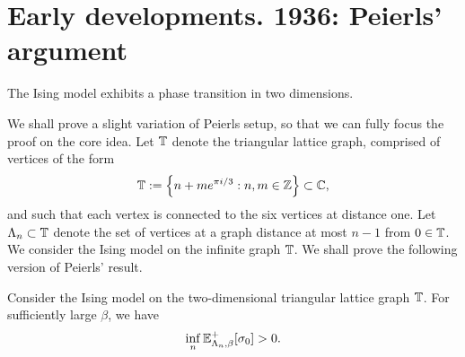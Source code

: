 \section{Early developments. 1936: Peierls' argument}
\label{sec:peierls}

\begin{theorem}[Peierls, 1936]
    \label{thm:peierls}
    The Ising model exhibits a phase transition in two dimensions.
\end{theorem}

We shall prove a slight variation of Peierls setup,
so that we can fully focus the proof on the core idea.
Let $\mathbb T$ denote the triangular lattice graph,
comprised of vertices of the form
\[
    \mathbb T:=\left\{n+m e^{\pi i/3}:n,m\in\mathbb Z \right\}\subset\mathbb C,
\]
and such that each vertex is connected to the six
vertices at distance one.
Let $\Lambda_n\subset\mathbb T$ denote the set of vertices at a graph
distance at most $n-1$ from $0\in\mathbb T$.
We consider the Ising model on the infinite graph $\mathbb T$.
We shall prove the following version of Peierls' result.

\begin{theorem}[Peierls, 1936]
    Consider the Ising model on the two-dimensional
    triangular lattice graph $\mathbb T$.
    For sufficiently large $\beta$,
    we have
    \[
        \inf_{n}\mathbb E_{\Lambda_n,\beta}^+[\sigma_0]
        >0.
    \]
\end{theorem}

